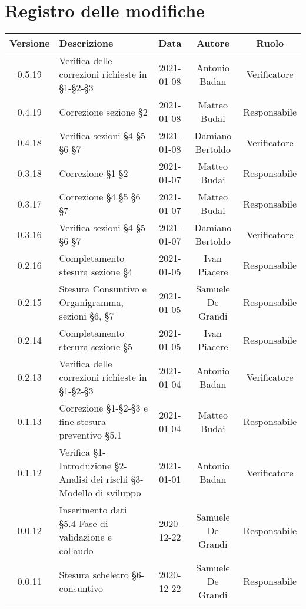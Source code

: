 \section*{Registro delle modifiche}

\begin{center}
	\begin{longtable}{|c|p{5cm}|c|c|c|}
	\hline
	\rowcolor{lighter-grayer}
	\textbf{Versione} & \textbf{Descrizione} & \textbf{Data} & \textbf{Autore} & \textbf{Ruolo} \\
	\hline
	\endfirsthead

	0.5.19 & Verifica delle correzioni richieste in §1-§2-§3 & 2021-01-08 & Antonio Badan & Verificatore \\
	\hline
	0.4.19 & Correzione sezione §2 & 2021-01-08 & Matteo Budai & Responsabile \\
	\hline
	0.4.18 & Verifica sezioni §4 §5 §6 §7 & 2021-01-08 & Damiano Bertoldo & Verificatore \\
	\hline
	0.3.18 & Correzione §1 §2 & 2021-01-07 & Matteo Budai & Responsabile \\
	\hline
	0.3.17 & Correzione §4 §5 §6 §7 & 2021-01-07 & Matteo Budai & Responsabile \\
	\hline
	0.3.16 & Verifica sezioni §4 §5 §6 §7 & 2021-01-07 & Damiano Bertoldo & Verificatore \\
	\hline
	0.2.16 & Completamento stesura sezione §4 & 2021-01-05 & Ivan Piacere & Responsabile \\
	\hline
	0.2.15 & Stesura Consuntivo e Organigramma, sezioni §6, §7 & 2021-01-05 & Samuele De Grandi & Responsabile \\
	\hline
	0.2.14 & Completamento stesura sezione §5 & 2021-01-05 & Ivan Piacere & Responsabile \\
	\hline
	0.2.13 & Verifica delle correzioni richieste in §1-§2-§3 & 2021-01-04 & Antonio Badan & Verificatore \\
	\hline
	0.1.13 & Correzione §1-§2-§3 e fine stesura preventivo §5.1 & 2021-01-04 & Matteo Budai & Responsabile \\
	\hline
	0.1.12 & Verifica §1-Introduzione §2-Analisi dei rischi §3-Modello di sviluppo & 2021-01-01 & Antonio Badan & Verificatore \\
	\hline
	0.0.12 & Inserimento dati §5.4-Fase di validazione e collaudo & 2020-12-22 & Samuele De Grandi & Responsabile \\
	\hline
	0.0.11 & Stesura scheletro §6-consuntivo & 2020-12-22 & Samuele De Grandi & Responsabile \\

\end{longtable}
\end{center}
